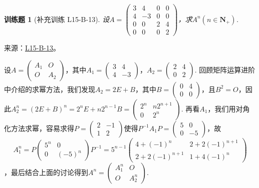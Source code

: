 \documentclass[UTF8,12pt,a4paper,fontset=fandol]{ctexart}
\newtheorem{exercise}{训练题}[section]
\begin{document}
\begin{exercise}[补充训练 L15-B-13]\label{prob:L15-B-13}
设$A=\begin{pmatrix}
                3 & 4 & 0 & 0 \\ 4 & -3 & 0 & 0 \\ 0 & 0 & 2 & 4 \\ 0 & 0 & 0 & 2
            \end{pmatrix}$，求$A^n(n\in\mathbf{N}_+)$.
\end{exercise}
\noindent 来源：\href{https://github.com/yhwu-is/Linear-Algebra-Left-Undone/blob/new/%E8%AE%B2%E4%B9%89/%E4%B8%93%E9%A2%98/15%20%E7%9B%B8%E4%BC%BC%E6%A0%87%E5%87%86%E5%BD%A2%EF%BC%9A%E5%A4%8D%E6%95%B0%E5%9F%9F%E4%B8%8A%E7%9A%84%E5%B0%9D%E8%AF%95%E4%B8%8E%E7%90%86%E8%AE%BA.tex}{L15-B-13}。
\begin{solve}
设$A=\begin{pmatrix}
                A_1 & O \\ O & A_2
            \end{pmatrix}$，其中$A_1=\begin{pmatrix}
                3 & 4 \\ 4 & -3
            \end{pmatrix}$，$A_2=\begin{pmatrix}
                2 & 4 \\ 0 & 2
            \end{pmatrix}$. 回顾矩阵运算进阶中介绍的求幂方法，我们发现$A_2=2E+B$，其中$B=\begin{pmatrix}
                0 & 4 \\ 0 & 0
            \end{pmatrix}$，且$B^2=O$，因此$A_2^n=(2E+B)^n=2^nE+n2^{n-1}B=\begin{pmatrix}
                2^n & n2^{n+1} \\ 0 & 2^n
            \end{pmatrix}$. 再看$A_1$，我们用对角化方法求幂，容易求得$P=\begin{pmatrix}
                2 & -1 \\ 1 & 2
            \end{pmatrix}$使得$P^{-1}A_1P=\begin{pmatrix}
                5 & 0 \\ 0 & -5
            \end{pmatrix}$，故
\[A_1^n=P\begin{pmatrix}
                5^n & 0 \\ 0 & (-5)^n
            \end{pmatrix}P^{-1}=5^{n-1}\begin{pmatrix}
                4+(-1)^n & 2+2(-1)^{n+1} \\ 2+2(-1)^{n+1} & 1+4(-1)^n
            \end{pmatrix}\]
，最后结合上面的讨论得到$A^n=\begin{pmatrix}
                A_1^n & O \\ O & A_2^n
            \end{pmatrix}$.
\end{solve}
\end{document}
